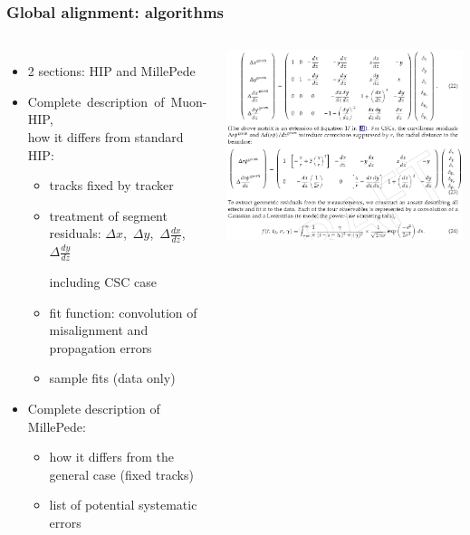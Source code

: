 \documentclass[compress]{beamer}
\begin{document}
\begin{frame}
\frametitle{Global alignment: algorithms}

\begin{columns}
\begin{itemize}
\item 2 sections: HIP and MillePede
\item \mbox{Complete description of Muon-HIP,\hspace{-1 cm}} \\ how it differs from standard HIP:
\begin{itemize}\setlength{\itemsep}{0.1 cm}
\item tracks fixed by tracker
\item treatment of segment residuals: \mbox{$\Delta x$, $\Delta y$, $\Delta \frac{dx}{dz}$, $\Delta \frac{dy}{dz}$\hspace{-1 cm}}

including CSC case

\item fit function: convolution of misalignment and propagation errors
\item sample fits (data only)
\end{itemize}

\item Complete description of MillePede:

\vspace{-0.2 cm}
\begin{itemize}
\item how it differs from the general case (fixed tracks)
\item list of potential systematic errors
\end{itemize}
\end{itemize}

\includegraphics[width=\linewidth]{hipalgo.png}


\end{columns}
\end{frame}
\end{document}
